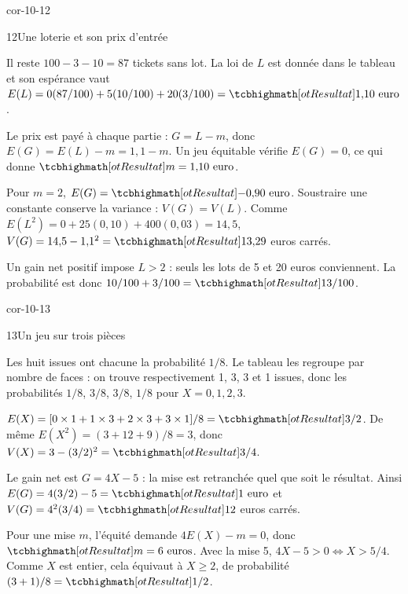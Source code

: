 \begin{blocLivre}{cor-10-12}
\begin{corrige}{12}{Une loterie et son prix d'entrée}
\begin{questions}
\item Il reste $100-3-10=87$ tickets sans lot.
La loi de $L$ est donnée dans le tableau et son espérance vaut
$E(L)=0(87/100)+5(10/100)+20(3/100)=\res{1{,}10\text{ euro}}$.
\item Le prix est payé à chaque partie : $G=L-m$, donc $E(G)=E(L)-m=1{,}1-m$.
Un jeu équitable vérifie $E(G)=0$, ce qui donne $\res{m=1{,}10\text{ euro}}$.
\item Pour $m=2$, $E(G)=\res{-0{,}90\text{ euro}}$.
Soustraire une constante conserve la variance : $V(G)=V(L)$.
Comme $E(L^2)=0+25(0{,}10)+400(0{,}03)=14{,}5$,
$V(G)=14{,}5-1{,}1^2=\res{13{,}29}$ euros carrés.
\item Un gain net positif impose $L>2$ : seuls les lots de 5 et 20 euros conviennent.
La probabilité est donc $10/100+3/100=\res{13/100}$.
\end{questions}

\label{figlivre-r10-12-loi-cor}

\end{corrige}
\end{blocLivre}
\begin{blocLivre}{cor-10-13}
\begin{corrige}{13}{Un jeu sur trois pièces}
\begin{questions}
\item Les huit issues ont chacune la probabilité $1/8$.
Le tableau les regroupe par nombre de faces : on trouve respectivement 1, 3, 3 et 1 issues,
donc les probabilités $1/8$, $3/8$, $3/8$, $1/8$ pour $X=0,1,2,3$.
\item $E(X)=[0\times1+1\times3+2\times3+3\times1]/8=\res{3/2}$.
De même $E(X^2)=(3+12+9)/8=3$, donc $V(X)=3-(3/2)^2=\res{3/4}$.
\item Le gain net est $G=4X-5$ : la mise est retranchée quel que soit le résultat.
Ainsi $E(G)=4(3/2)-5=\res{1\text{ euro}}$ et $V(G)=4^2(3/4)=\res{12}$ euros carrés.
\item Pour une mise $m$, l’équité demande $4E(X)-m=0$, donc $\res{m=6\text{ euros}}$.
Avec la mise 5, $4X-5>0\iff X>5/4$. Comme $X$ est entier, cela équivaut à $X\geq2$,
de probabilité $(3+1)/8=\res{1/2}$.
\end{questions}

\label{figlivre-r10-13-issues-cor}

\end{corrige}
\end{blocLivre}
